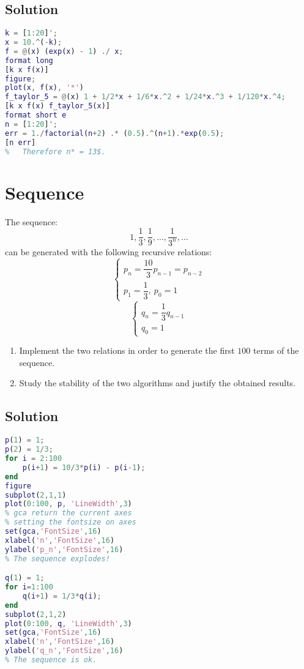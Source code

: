 \documentclass[12pt, a4paper]{report}
\newtheorem[style=M,bodystyle=\normalfont]{theorem}{Theorem}
\newtheorem[style=M,bodystyle=\normalfont]{corollary}{Corollary}
\newtheorem[style=M,bodystyle=\normalfont]{lemma}{Lemma}
\newtheorem[style=M,bodystyle=\normalfont]{definition}{Definition}
\begin{document}
    \subsection*{Solution}
        \begin{lstlisting}[language=Matlab]
%   Evaluate f(x) for values of x around zero (try with xk = 10^{-k}, k in [1,20]). What do you obtain? Explain the results.
k = [1:20]';
x = 10.^(-k);
f = @(x) (exp(x) - 1) ./ x;
format long
[k x f(x)]
figure;
plot(x, f(x), '*')
f_taylor_5 = @(x) 1 + 1/2*x + 1/6*x.^2 + 1/24*x.^3 + 1/120*x.^4;
[k x f(x) f_taylor_5(x)]
format short e
n = [1:20]';
err = 1./factorial(n+2) .* (0.5).^(n+1).*exp(0.5);
[n err]
%   Therefore n* = 13$.            
        \end{lstlisting}

    \newpage

    \section{Sequence}
        The sequence: 
        \[1, \dfrac{1}{3}, \dfrac{1}{9}, \dots, \dfrac{1}{3^n},\dots\]
        can be generated with the following recursive relations: 
        \[
        \begin{cases}
            p_n=\dfrac{10}{3}p_{n-1}=p_{n-2}  \\
            p_1 = \dfrac{1}{3}, \: p_0=1
        \end{cases}
        \]
        \[
        \begin{cases}
            q_n=\dfrac{1}{3}q_{n-1}  \\
            q_0=1
        \end{cases}
        \]
        \begin{enumerate}
            \item Implement the two relations in order to generate the first $100$ terms of the sequence.
            \item Study the stability of the two algorithms and justify the obtained results. 
        \end{enumerate}
    \subsection*{Solution}
        \begin{lstlisting}[language=Matlab]
p(1) = 1;
p(2) = 1/3;
for i = 2:100
    p(i+1) = 10/3*p(i) - p(i-1);
end
figure
subplot(2,1,1)
plot(0:100, p, 'LineWidth',3)
% gca return the current axes 
% setting the fontsize on axes
set(gca,'FontSize',16)
xlabel('n','FontSize',16)
ylabel('p_n','FontSize',16)
% The sequence explodes!

q(1) = 1;
for i=1:100
    q(i+1) = 1/3*q(i);
end
subplot(2,1,2)
plot(0:100, q, 'LineWidth',3)
set(gca,'FontSize',16)
xlabel('n','FontSize',16)
ylabel('q_n','FontSize',16)
% The sequence is ok.
        \end{lstlisting}
\end{document}
